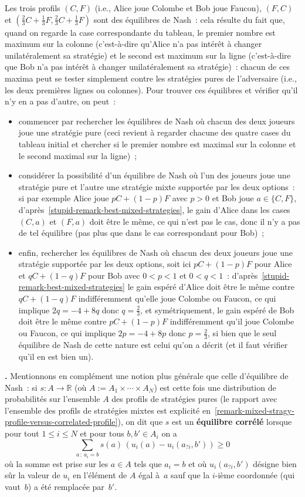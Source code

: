 \documentclass[12pt,a4paper]{article}
\theoremstyle{definition}
\newcommand\thingy{%
\refstepcounter{comcnt}\smallskip\noindent\textbf{\thecomcnt.} }
\newcommand{\defin}[2][]{\def\latexsucks{#1}\ifx\latexsucks\empty\index{#2}\else\index{\latexsucks}\fi\textbf{#2}}
\begin{document}
Les trois profils $(C,F)$ (i.e., Alice joue Colombe et Bob joue
Faucon), $(F,C)$ et $(\frac{2}{3}C+\frac{1}{3}F,
\frac{2}{3}C+\frac{1}{3}F)$ sont des équilibres de Nash : cela résulte
du fait que, quand on regarde la case correspondante du tableau, le
premier nombre est maximum sur la colonne (c'est-à-dire qu'Alice n'a
pas intérêt à changer unilatéralement sa stratégie) et le second est
maximum sur la ligne (c'est-à-dire que Bob n'a pas intérêt à changer
unilatéralement sa stratégie) : chacun de ces maxima peut se tester
simplement contre les stratégies pures de l'adversaire (i.e., les deux
premières lignes ou colonnes).  Pour trouver ces équilibres et
vérifier qu'il n'y en a pas d'autre, on peut :
\begin{itemize}
\item commencer par rechercher les équilibres de Nash où chacun des
  deux joueurs joue une stratégie pure (ceci revient à regarder
  chacune des quatre cases du tableau initial et chercher si le
  premier nombre est maximal sur la colonne et le second maximal sur
  la ligne) ;
\item considérer la possibilité d'un équilibre de Nash où l'un des
  joueurs joue une stratégie pure et l'autre une stratégie mixte
  supportée par les deux options : si par exemple Alice joue
  $pC+(1-p)F$ avec $p>0$ et Bob joue $a \in \{C,F\}$,
  d'après \ref{stupid-remark-best-mixed-strategies}, le gain d'Alice
  dans les cases $(C,a)$ et $(F,a)$ doit être le même, ce qui n'est
  pas le cas, donc il n'y a pas de tel équilibre (pas plus que dans le
  cas correspondant pour Bob) ;
\item enfin, rechercher les équilibres de Nash où chacun des deux
  joueurs joue une stratégie supportée par les deux options, soit ici
  $pC+(1-p)F$ pour Alice et $qC+(1-q)F$ pour Bob avec $0<p<1$ et
  $0<q<1$ : d'après \ref{stupid-remark-best-mixed-strategies} le gain
  espéré d'Alice doit être le même contre $qC+(1-q)F$ indifféremment
  qu'elle joue Colombe ou Faucon, ce qui implique $2q = -4+8q$ donc
  $q=\frac{2}{3}$, et symétriquement, le gain espéré de Bob doit être
  le même contre $pC+(1-p)F$ indifféremment qu'il joue Colombe ou
  Faucon, ce qui implique $2p = -4+8p$ donc $p=\frac{2}{3}$, si bien
  que le seul équilibre de Nash de cette nature est celui qu'on a
  décrit (et il faut vérifier qu'il en est bien un).
\end{itemize}

\thingy Mentionnons en complément une notion plus générale que celle
d'équilibre de Nash : si $s\colon A \to \mathbb{R}$ (où $A :=
A_1\times\cdots\times A_N$) est cette fois une distribution de
probabilités sur l'ensemble $A$ des profils de stratégies pures (le
rapport avec l'ensemble des profils de stratégies mixtes est explicité
en \ref{remark-mixed-stragy-profile-versus-correlated-profile}), on
dit que $s$ est un \defin{équilibre
  corrélé} lorsque pour tout $1 \leq i \leq N$ et pour tous $b,b' \in
A_i$ on a
\[
\sum_{a\,:\, a_i = b} s(a)\,(u_i(a) - u_i(a_{?i},b'))\geq 0
\]
où la somme est prise sur les $a \in A$ tels que $a_i = b$ et où
$u_i(a_{?i},b')$ désigne bien sûr la valeur de $u_i$ en l'élément de
$A$ égal à $a$ sauf que la $i$-ième coordonnée (qui vaut $b$) a été
remplacée par $b'$.
\end{document}
